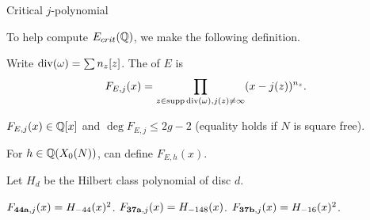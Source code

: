 \documentclass[handout]{beamer}
\begin{document}
\begin{frame}{Critical $j$-polynomial}





To help compute $E_{crit}(\mathbb{Q})$, we make the following definition. 
\begin{Def}
Write $\operatorname{div}(\omega) = \sum n_z[z]$. The  of $E$ is 
\[
F_{E,j}(x) = \prod_{z \in \operatorname{supp} \operatorname{div}(\omega), j(z) \neq \infty}(x-j(z))^{n_z}.
\]
\end{Def}
$F_{E,j}(x) \in \mathbb{Q}[x]$ and $\deg F_{E,j} \leq 2g-2$ (equality holds if $N$ is square free). 

\pause
\medskip

For $h \in \mathbb{Q}(X_0(N))$, can define $F_{E,h}(x)$. 

\pause
\medskip


Let $H_d$ be the Hilbert class polynomial of disc $d$. 
\begin{Example}
$F_{{\bf 44a},j}(x) = H_{-44}(x)^2$. $F_{{\bf 37a},j}(x) = H_{-148}(x)$. $F_{{\bf 37b},j}(x) = H_{-16}(x)^2$.
\end{Example}


\end{frame}

\end{document}
